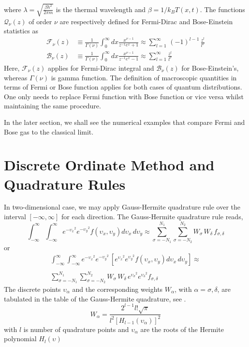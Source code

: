 \documentclass{rsproca}%
\begin{document}
where \(\lambda=\sqrt{\frac{\beta h^2}{2\pi m}}\) is the thermal wavelength and \(\beta=1/k_{B} T(x,t)\).  The functions $\mathcal{Q}_{\nu}(z)$ of order $\nu$ are respectively defined for Fermi-Dirac and Bose-Einstein statistics as
\begin {align}
\mathcal{F}_{\nu}(z)&\equiv \frac{1}{\Gamma(\nu)} \int^{\infty}_{0}{dx\frac{x^{\nu -1}}{z^{-1}e^{x} +1}}\approx\sum^{\infty}_{l=1}\,(-1)^{l-1}\,{\frac{z^l}{l^\nu}}\\
\mathcal{B}_{\nu}(z)&\equiv \frac{1}{\Gamma(\nu)} \int^{\infty}_{0}{dx\frac{x^{\nu-1}}{z^{-1}e^{x}-1}}\approx\sum^{\infty}_{l=1}{\frac{z^l}{l^\nu}}
\end{align}
Here,  \(\mathcal{F}_{\nu}(z)\) applies for Fermi-Dirac integral and \(\mathcal{B}_{\nu}(z)\) for Bose-Einstein's, whereas \(\Gamma(\nu)\) is gamma function. The definition of macroscopic quantities in terms of Fermi or Bose function applies for both cases of quantum distributions. One only needs to replace Fermi function with Bose function or vice versa whilst maintaining the same procedure.

In the later section, we shall see the numerical examples that compare Fermi and Bose gas to the classical limit.

\section{ Discrete Ordinate Method and Quadrature Rules}
\label{sec:3}
In two-dimensional case, we may apply Gauss-Hermite quadrature rule over the interval $[-\infty,\infty]$ for each direction.  The Gauss-Hermite quadrature rule reads,
\begin{equation}
\int^{\infty}_{-\infty}\int^{\infty}_{-\infty}{e^{-{\upsilon_x}^2}e^{-{\upsilon_y}^2}f(\upsilon_x,\upsilon_y)d\upsilon_x\,d\upsilon_y} \approx \sum^{N_1}_{\sigma=-N_1}\sum^{N_2}_{\sigma=-N_2}{W_\sigma\,W_\delta\, f_{\sigma,\delta}}
\end{equation}
or
\begin{eqnarray}
\int^{\infty}_{-\infty}\int^{\infty}_{-\infty}{e^{-{\upsilon_x}^2}e^{-{\upsilon_y}^2}\,[e^{{\upsilon_x}^2}e^{{\upsilon_y}^2}f(\upsilon_x,\upsilon_y) d\upsilon_x\,d\upsilon_y]} \approx \nonumber \\
\nonumber \\
\sum^{N_1}_{\sigma=-N_1}\sum^{N_2}_{\sigma=-N_2}{W_\sigma\,W_\delta\,e^{{\upsilon_\sigma}^2}e^{{\upsilon_\delta}^2}f_{\sigma,\delta}}
\end{eqnarray}
The discrete points $\upsilon_\alpha$ and the corresponding weights $W_\alpha$, with $\alpha=\sigma,\delta$, are tabulated in the table of the Gauss-Hermite quadrature, see \cite{abramowitz+stegun}.
\begin{equation}
W_\alpha = \frac{2^{l-1}l!\sqrt{\pi}}{l^2[H_{l-1}(\upsilon_\alpha)]^2}
\label{weightsgh}
\end{equation}
with $l$ is number of quadrature points and $\upsilon_\alpha$ are the roots of the Hermite polynomial \(H_l(\upsilon)\)
\end{document}
